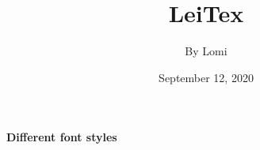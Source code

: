 \documentclass[a4paper]{book}
\begin{document}
\title{\LARGE{\textbf{LeiTex}}}
\author{By Lomi}
\date{September 12, 2020}
\maketitle


\Large{\textbf{Different font styles}}
\end{document}
